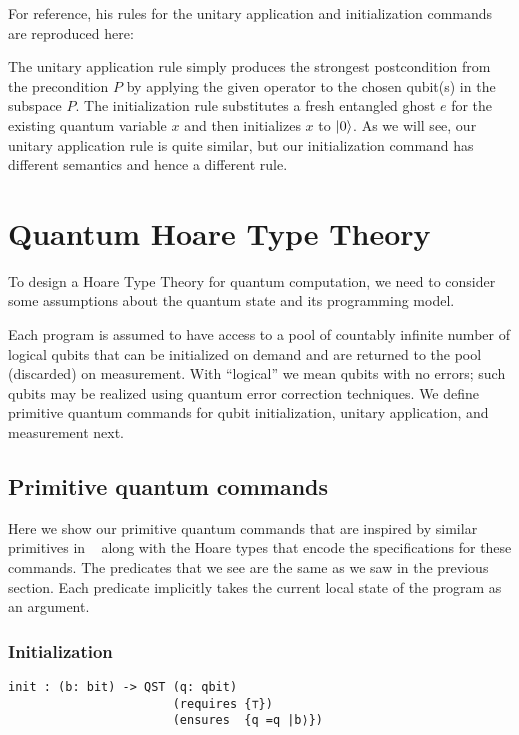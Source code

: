 For reference, his rules for the unitary application and initialization commands are reproduced here:

The unitary application rule simply produces the strongest postcondition from the precondition $P$ by applying the given operator to the chosen qubit(s) in the subspace $P$. The initialization rule substitutes a fresh entangled ghost $e$ for the existing quantum variable $x$ and then initializes $x$ to $\ket{0}$. As we will see, our unitary application rule is quite similar, but our initialization command has different semantics and hence a different rule.

\section{Quantum Hoare Type Theory}
To design a Hoare Type Theory for quantum computation, we need to consider some assumptions about the quantum state and its programming model.

Each program is assumed to have access to a pool of countably infinite number of logical qubits that can be initialized on demand and are returned to the pool (discarded) on measurement. With ``logical'' we mean qubits with no errors; such qubits may be realized using quantum error correction techniques. We define primitive quantum commands for qubit initialization, unitary application, and measurement next.

\subsection{Primitive quantum commands}

Here we show our primitive quantum commands that are inspired by similar primitives in ~\parencite{qio} along with the Hoare types that encode the specifications for these commands. The predicates that we see are the same as we saw in the previous section. Each predicate implicitly takes the current local state of the program as an argument.

\subsubsection{Initialization}
\begin{lstlisting}[language=QHaskell]
init : (b: bit) -> QST (q: qbit)
                       (requires {⊤})
                       (ensures  {q =q |b⟩})
\end{lstlisting}

